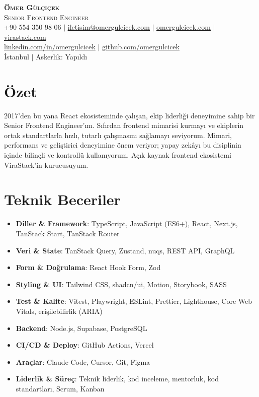 \documentclass[a4paper,11pt]{article}
\begin{document}
\begin{center}
    \textbf{\Huge \scshape Ömer Gülçiçek} \\ \vspace{1pt}
    {\Large \scshape Senior Frontend Engineer} \\ \vspace{2pt}
    \small +90 554 350 98 06 $|$ \href{mailto:iletisim@omergulcicek.com}{\underline{iletisim@omergulcicek.com}} $|$ \href{https://omergulcicek.com/}{\underline{omergulcicek.com}} $|$ \href{https://virastack.com/}{\underline{virastack.com}} \\
    \small \href{https://linkedin.com/in/omergulcicek}{\underline{linkedin.com/in/omergulcicek}} $|$ \href{https://github.com/omergulcicek}{\underline{github.com/omergulcicek}} \\
    \small İstanbul $|$ Askerlik: Yapıldı
\end{center}

\section{Özet}
{\small
2017'den bu yana React ekosisteminde çalışan, ekip liderliği deneyimine sahip bir Senior Frontend Engineer'ım. Sıfırdan frontend mimarisi kurmayı ve ekiplerin ortak standartlarla hızlı, tutarlı çalışmasını sağlamayı seviyorum. Mimari, performans ve geliştirici deneyimine önem veriyor; yapay zekâyı bu disiplinin içinde bilinçli ve kontrollü kullanıyorum. Açık kaynak frontend ekosistemi ViraStack'in kurucusuyum.\par
}

\section{Teknik Beceriler}
 \begin{itemize}[leftmargin=0.15in, label={}, itemsep=0pt]
    \small
     \item \textbf{Diller \& Framework}: TypeScript, JavaScript (ES6+), React, Next.js, TanStack Start, TanStack Router
     \item \textbf{Veri \& State}: TanStack Query, Zustand, nuqs, REST API, GraphQL
     \item \textbf{Form \& Doğrulama}: React Hook Form, Zod
     \item \textbf{Styling \& UI}: Tailwind CSS, shadcn/ui, Motion, Storybook, SASS
     \item \textbf{Test \& Kalite}: Vitest, Playwright, ESLint, Prettier, Lighthouse, Core Web Vitals, erişilebilirlik (ARIA)
     \item \textbf{Backend}: Node.js, Supabase, PostgreSQL
     \item \textbf{CI/CD \& Deploy}: GitHub Actions, Vercel
     \item \textbf{Araçlar}: Claude Code, Cursor, Git, Figma
     \item \textbf{Liderlik \& Süreç}: Teknik liderlik, kod inceleme, mentorluk, kod standartları, Scrum, Kanban
 \end{itemize}
\end{document}
